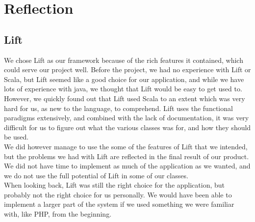 \section{Reflection}
\label{sec:reflection}

\subsection{Lift}
We chose Lift as our framework because of the rich features it contained, which could serve our project well. Before the project, we had no experience with Lift or Scala, but Lift seemed like a good choice for our application, and while we have lots of experience with java, we thought that Lift would be easy to get used to.\\
However, we quickly found out that Lift used Scala to an extent which was very hard for us, as new to the language, to comprehend. Lift uses the functional paradigms extensively, and combined with the lack of documentation, it was very difficult for us to figure out what the various classes was for, and how they should be used.\\
We did however manage to use the some of the features of Lift that we intended, but the problems we had with Lift are reflected in the final result of our product. We did not have time to implement as much of the application as we wanted, and we do not use the full potential of Lift in some of our classes. \\ 

When looking back, Lift was still the right choice for the application, but probably not the right choice for us personally. We would have been able to implement a larger part of the system if we used something we were familiar with, like PHP, from the beginning.

